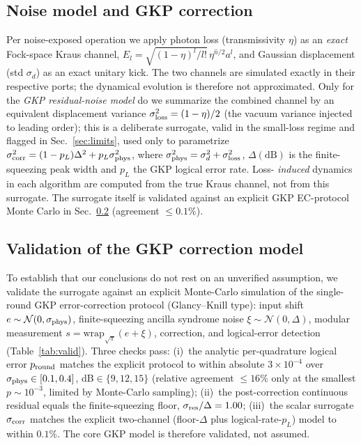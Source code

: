\documentclass[aps,prxquantum,reprint,superscriptaddress,nofootinbib]{revtex4-2}
\begin{document}
\subsection{Noise model and GKP correction}
Per noise-exposed operation we apply photon loss (transmissivity $\eta$) as
an \emph{exact} Fock-space Kraus channel,
$E_l=\sqrt{(1-\eta)^l/l!}\,\eta^{\hat n/2}a^l$, and Gaussian displacement
(std $\sigma_d$) as an exact unitary kick. The two channels are simulated
exactly in their respective ports; the dynamical evolution is therefore not
approximated. Only for the \emph{GKP residual-noise model} do we summarize the
combined channel by an equivalent displacement variance
$\sigma_{\rm loss}^2=(1-\eta)/2$ (the vacuum variance injected to leading
order); this is a deliberate surrogate, valid in the small-loss regime and
flagged in Sec.~\ref{sec:limits}, used only to parametrize
$\sigma_{\rm corr}^2=(1-p_L)\Delta^2+p_L\sigma_{\rm phys}^2$, where
$\sigma_{\rm phys}^2=\sigma_d^2+\sigma_{\rm loss}^2$, $\Delta(\mathrm{dB})$ is
the finite-squeezing peak width and $p_L$ the GKP logical error rate. Loss-
\emph{induced} dynamics in each algorithm are computed from the true Kraus
channel, not from this surrogate. The surrogate itself is validated against an
explicit GKP EC-protocol Monte Carlo in Sec.~\ref{sec:valid}
(agreement $\le0.1\%$).

\subsection{Validation of the GKP correction model}\label{sec:valid}
To establish that our conclusions do not rest on an unverified assumption, we
validate the surrogate against an explicit Monte-Carlo simulation of the
single-round GKP error-correction protocol (Glancy--Knill type): input shift
$e\sim\mathcal N(0,\sigma_{\rm phys})$, finite-squeezing ancilla syndrome noise
$\xi\sim\mathcal N(0,\Delta)$, modular measurement
$s=\mathrm{wrap}_{\sqrt\pi}(e+\xi)$, correction, and logical-error detection
(Table~\ref{tab:valid}). Three checks pass: (i)~the analytic per-quadrature
logical error $p_{\rm round}$ matches the explicit protocol to within absolute
$3\times10^{-4}$ over $\sigma_{\rm phys}\in[0.1,0.4]$, dB$\in\{9,12,15\}$
(relative agreement $\le16\%$ only at the smallest $p\sim10^{-3}$, limited by
Monte-Carlo sampling); (ii)~the post-correction continuous residual equals the
finite-squeezing floor, $\sigma_{\rm res}/\Delta=1.00$; (iii)~the scalar
surrogate $\sigma_{\rm corr}$ matches the explicit two-channel
(floor-$\Delta$ plus logical-rate-$p_L$) model to within $0.1\%$. The core GKP
model is therefore validated, not assumed.
\end{document}

